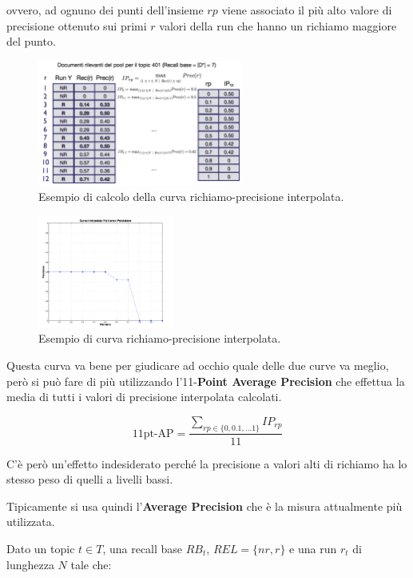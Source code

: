 ovvero, ad ognuno dei punti dell'insieme $rp$ viene associato il più alto valore di precisione ottenuto sui primi $r$ valori della run che hanno un richiamo maggiore del punto.

\begin{figure}[htbp]
	\centering
	\includegraphics[width=0.6\textwidth]{images/l15-fig-5.png}
	\caption{Esempio di calcolo della curva richiamo-precisione interpolata.}
\end{figure}

\begin{figure}[htbp]
	\centering
	\includegraphics[width=0.4\textwidth]{images/l15-fig-6.png}
	\caption{Esempio di curva richiamo-precisione interpolata.}
\end{figure}


Questa curva va bene per giudicare ad occhio quale delle due curve va meglio, però si può fare di più utilizzando l'11-\textbf{Point Average Precision} che effettua la media di tutti i valori di precisione interpolata calcolati.

$$
\text{11pt-AP} = \frac{\sum_{rp\in\{0,0.1,\ldots 1 \}}IP_{rp}}{11}
$$

C'è però un'effetto indesiderato perché la precisione a valori alti di richiamo ha lo stesso peso di quelli a livelli bassi.

Tipicamente si usa quindi l'\textbf{Average Precision} che è la misura attualmente più utilizzata.

Dato un topic $t \in T$, una recall base $RB_t$, $REL =\{ nr, r \}$ e una run $r_t$ di lunghezza $N$ tale che:


